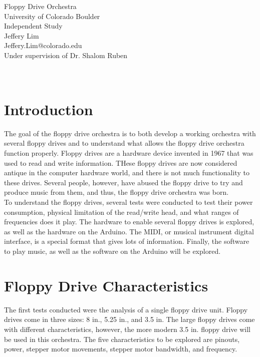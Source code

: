 \documentclass[11pt, a4paper]{report}
\begin{document}
\begin{center}
  \Huge Floppy Drive Orchestra \\
  \huge University of Colorado Boulder \\
  \Large Independent Study\\
  
  \vspace{6in}
    \huge Jeffery Lim \\
    \huge Jeffery.Lim@colorado.edu\\
    \Large Under supervision of Dr. Shalom Ruben \\~\\~\\
\end{center}
\pagebreak

\tableofcontents

\chapter{Introduction}

The goal of the floppy drive orchestra is to both develop a working orchestra with several floppy drives and to understand what allows the floppy drive orchestra function properly. Floppy drives are a hardware device invented in 1967 that was used to read and write information. THese floppy drives are now considered antique in the computer hardware world, and there is not much functionality to these drives. Several people, however, have abused the floppy drive to try and produce music from them, and thus, the floppy drive orchestra was born. \\

To understand the floppy drives, several tests were conducted to test their power consumption, physical limitation of the read/write head, and what ranges of frequencies does it play. The hardware to enable several floppy drives is explored, as well as the hardware on the Arduino. The MIDI, or musical instrument digital interface, is a special format that gives lots of information. Finally, the software to play music, as well as the software on the Arduino will be explored. 

\chapter{Floppy Drive Characteristics}

The first tests conducted were the analysis of a single floppy drive unit. Floppy drives come in three sizes: 8 in., 5.25 in., and 3.5 in. The large floppy drives come with different characteristics, however, the more modern 3.5 in. floppy drive will be used in this orchestra. The five characteristics to be explored are pinouts, power, stepper motor movements, stepper motor bandwidth, and frequency.
\end{document}
